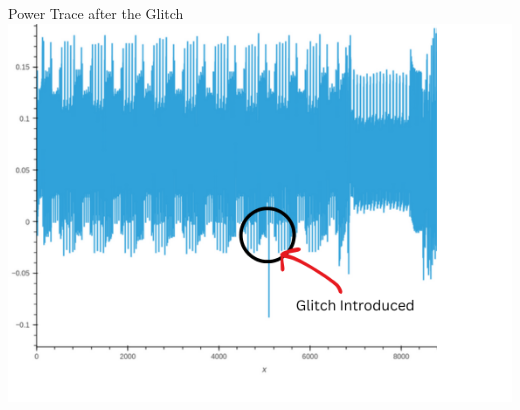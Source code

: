 \documentclass{beamer}
\newenvironment{tres important}[2][]{
	\setkeys{EmphEqEnv}{#2}
	\setkeys{EmphEqOpt}{box={\setlength{\fboxsep}{10pt}\fcolorbox{myNewColorA}{white}},#1}
	\EmphEqMainEnv}
{\endEmphEqMainEnv}
\begin{document}
\begin{frame}[fragile]{Power Trace after the Glitch}
  \centering
  \includegraphics[width=0.8\linewidth]{images/2.png}
  \caption{Power Trace of AES 128 after the Glitch Using CWLite ARM}
\end{frame}
\end{document}
